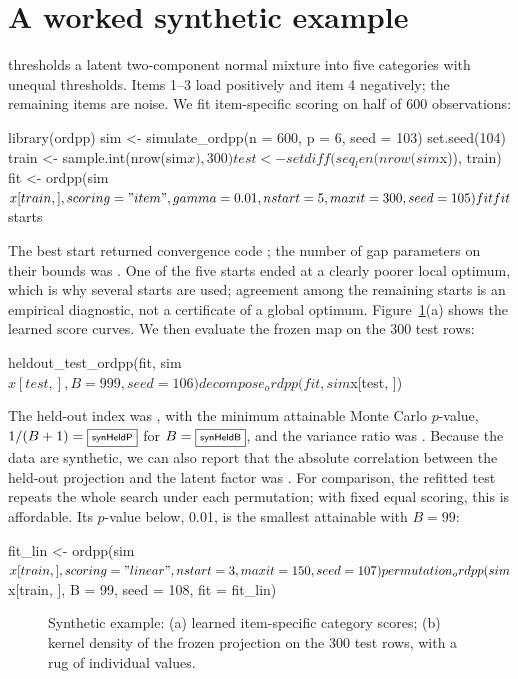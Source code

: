 \section{A worked synthetic example}
 thresholds a latent two-component normal mixture into five categories with unequal thresholds. Items 1--3 load positively and item 4 negatively; the remaining items are noise. We fit item-specific scoring on half of 600 observations:
\begin{example}
library(ordpp)
sim <- simulate_ordpp(n = 600, p = 6, seed = 103)
set.seed(104)
train <- sample.int(nrow(sim$x), 300)
test <- setdiff(seq_len(nrow(sim$x)), train)
fit <- ordpp(sim$x[train, ], scoring = "item", gamma = 0.01,
             nstart = 5, maxit = 300, seed = 105)
fit
fit$starts
\end{example}

The best start returned convergence code \synConv{}; the number of gap parameters on their bounds was \synBounds{}. One of the five starts ended at a clearly poorer local optimum, which is why several starts are used; agreement among the remaining starts is an empirical diagnostic, not a certificate of a global optimum. Figure~\ref{fig:syn}(a) shows the learned score curves. We then evaluate the frozen map on the 300 test rows:
\begin{example}
heldout_test_ordpp(fit, sim$x[test, ], B = 999, seed = 106)
decompose_ordpp(fit, sim$x[test, ])
\end{example}

The held-out index was \synTestIndex{}, with the minimum attainable Monte Carlo $p$-value, $1/(B+1)=\fbox{\scriptsize\textsf{synHeldP}}$ for $B=\fbox{\scriptsize\textsf{synHeldB}}$, and the variance ratio was \synVarRatio{}. Because the data are synthetic, we can also report that the absolute correlation between the held-out projection and the latent factor was \synLatentCor{}. For comparison, the refitted test repeats the whole search under each permutation; with fixed equal scoring, this is affordable. Its $p$-value below, 0.01, is the smallest attainable with $B=99$:
\begin{example}
fit_lin <- ordpp(sim$x[train, ], scoring = "linear", nstart = 3,
                 maxit = 150, seed = 107)
permutation_ordpp(sim$x[train, ], B = 99, seed = 108, fit = fit_lin)
\end{example}

\begin{figure}[htbp]
\centering
{}
\caption{Synthetic example: (a) learned item-specific category scores; (b) kernel density of the frozen projection on the 300 test rows, with a rug of individual values.}
\label{fig:syn}
\end{figure}

